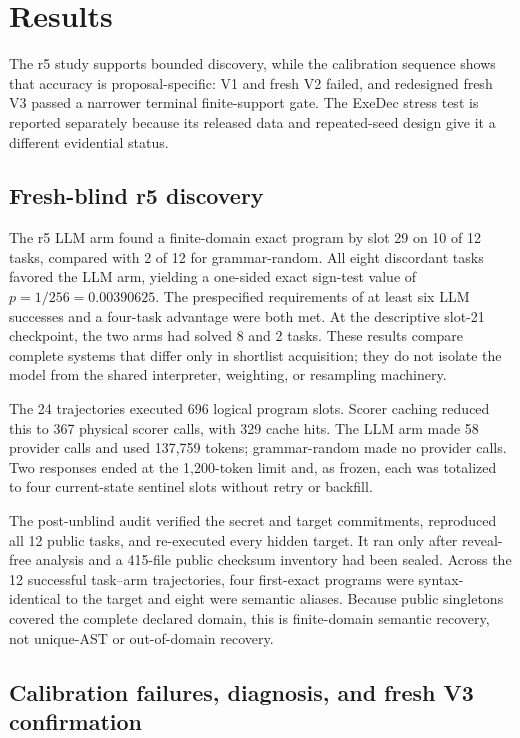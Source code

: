 \documentclass[twoside,11pt]{article}
\begin{document}
\section{Results}
\label{sec:results}

The r5 study supports bounded discovery, while the calibration sequence shows
that accuracy is proposal-specific: V1 and fresh V2 failed, and redesigned
fresh V3 passed a narrower terminal finite-support gate. The ExeDec stress test
is reported separately because its released data and repeated-seed design give
it a different evidential status.

\subsection{Fresh-blind r5 discovery}

The r5 LLM arm found a finite-domain exact program by slot 29 on 10 of 12 tasks,
compared with 2 of 12 for grammar-random. All eight discordant tasks favored the
LLM arm, yielding a one-sided exact sign-test value of
$p=1/256=0.00390625$. The prespecified requirements of at least six LLM
successes and a four-task advantage were both met. At the descriptive slot-21
checkpoint, the two arms had solved 8 and 2 tasks. These results compare
complete systems that differ only in shortlist acquisition; they do not isolate
the model from the shared interpreter, weighting, or resampling machinery.

The 24 trajectories executed 696 logical program slots. Scorer caching reduced
this to 367 physical scorer calls, with 329 cache hits. The LLM arm made 58
provider calls and used 137,759 tokens; grammar-random made no provider calls.
Two responses ended at the 1,200-token limit and, as frozen, each was totalized
to four current-state sentinel slots without retry or backfill.

The post-unblind audit verified the secret and target commitments, reproduced
all 12 public tasks, and re-executed every hidden target. It ran only after
reveal-free analysis and a 415-file public checksum inventory had been sealed.
Across the
12 successful task--arm trajectories, four first-exact programs were
syntax-identical to the target and eight were semantic aliases. Because public
singletons covered the complete declared domain, this is finite-domain semantic
recovery, not unique-AST or out-of-domain recovery.

\FloatBarrier
\subsection{Calibration failures, diagnosis, and fresh V3 confirmation}
\end{document}
